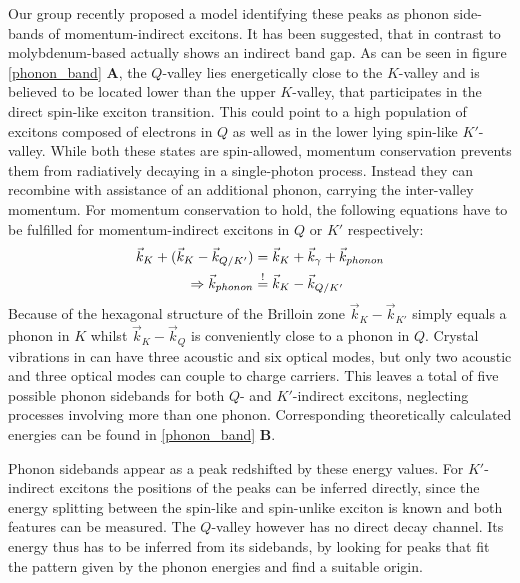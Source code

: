 Our group recently proposed a model identifying these peaks as phonon side-bands of momentum-indirect excitons\cite{lindlau_identifying_2017}. It has been suggested, that in contrast to molybdenum-based \tmds \wse actually shows an indirect band gap\cite{zhang_probing_2015, hsu_evidence_2017}. As can be seen in figure \ref{phonon_band} \textbf{A}, the $Q$-valley lies energetically close to the $K$-valley and is believed to be located lower than the upper $K$-valley, that participates in the direct spin-like exciton transition. This could point to a high population of excitons composed of electrons in $Q$ as well as in the lower lying spin-like $K'$-valley. While both these states are spin-allowed, momentum conservation prevents them from radiatively decaying in a single-photon process. Instead they can recombine with assistance of an additional phonon, carrying the inter-valley momentum. For momentum conservation to hold, the following equations have to be fulfilled for momentum-indirect excitons in $Q$ or $K'$ respectively:
\begin{align}
	\vec{k}_K + (\vec{k}_K - \vec{k}_{Q/K'}) &= \vec{k}_K + \vec{k}_\gamma + \vec{k}_{phonon}\\
	\Rightarrow \vec{k}_{phonon} &\overset{!}{=} \vec{k}_K - \vec{k}_{Q/K'}
\end{align}
Because of the hexagonal structure of the Brilloin zone $\vec{k}_K - \vec{k}_{K'}$ simply equals a phonon in $K$ whilst $\vec{k}_K - \vec{k}_{Q}$ is conveniently close to a phonon in $Q$. Crystal vibrations in \tmds can have three acoustic and six optical modes, but only two acoustic and three optical modes can couple to charge carriers. This leaves a total of five possible phonon sidebands for both $Q$- and $K'$-indirect excitons, neglecting processes involving more than one phonon. Corresponding theoretically calculated energies can be found in \ref{phonon_band} \textbf{B}\cite{jin_intrinsic_2014}. 

Phonon sidebands appear as a peak redshifted by these energy values. For $K'$-indirect excitons the positions of the peaks can be inferred directly, since the energy splitting between the spin-like and spin-unlike exciton is known and both features can be measured. The $Q$-valley however has no direct decay channel. Its energy thus has to be inferred from its sidebands, by looking for peaks that fit the pattern given by the phonon energies and find a suitable origin.

\begin{figure}[t]
\centering

\end{figure}
\cite{van_der_donck_excitons_2018} 

